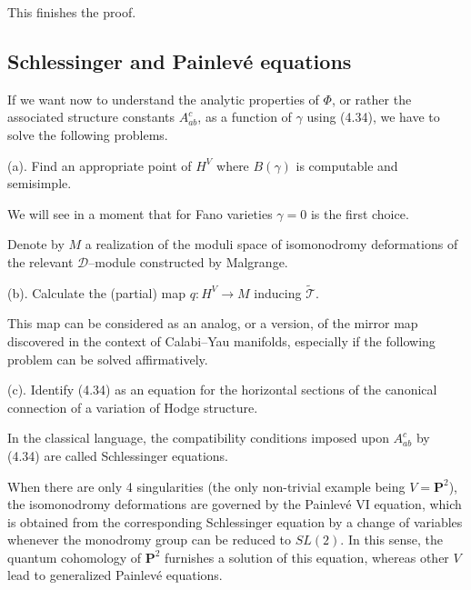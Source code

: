 \documentclass[reqno]{amsart}
\theoremstyle{definition}
\begin{document}
\smallskip

This finishes the proof.

\medskip

\subsection{Schlessinger and Painlev\'e  equations}
If we want now to
understand
the analytic properties of $\Phi$, or rather the associated
structure constants $A_{ab}^c$, as a function of $\gamma$ using (4.34),
we have to solve the following problems.

\smallskip

(a). Find an appropriate point of $H^V$ where $B(\gamma )$ is
computable and semisimple.

\smallskip

We will see in a moment that for Fano varieties
$\gamma =0$ is the first choice.

\smallskip

Denote by $M$ a realization of the moduli space of isomonodromy
deformations of the relevant $\mathcal{D}$--module constructed by Malgrange.

\smallskip

(b). Calculate the (partial) map $q: H^V\to M$ inducing
$\widetilde{\mathcal{T}}$.

\smallskip

This map can be considered as an analog, or a version, of the mirror
map discovered in the context of Calabi--Yau manifolds,
especially if the following problem can be solved affirmatively.

\smallskip

(c). Identify (4.34) as an equation for the horizontal sections
of the canonical connection of a variation of Hodge structure.

\smallskip

In the classical language, the compatibility conditions
imposed upon $A_{ab}^c$ by (4.34) are called Schlessinger equations.

\smallskip

When there are only 4 singularities (the only non-trivial example being
$V=\mathbf{P}^2$), the isomonodromy deformations are governed
by the Painlev\'e VI equation, which is obtained from the
corresponding Schlessinger equation by a change of variables
whenever the monodromy group can be reduced to $SL(2)$.
In this sense, the quantum cohomology
of $\mathbf{P}^2$ furnishes a solution of this equation, whereas
other $V$ lead to generalized Painlev\'e equations.
\end{document}
